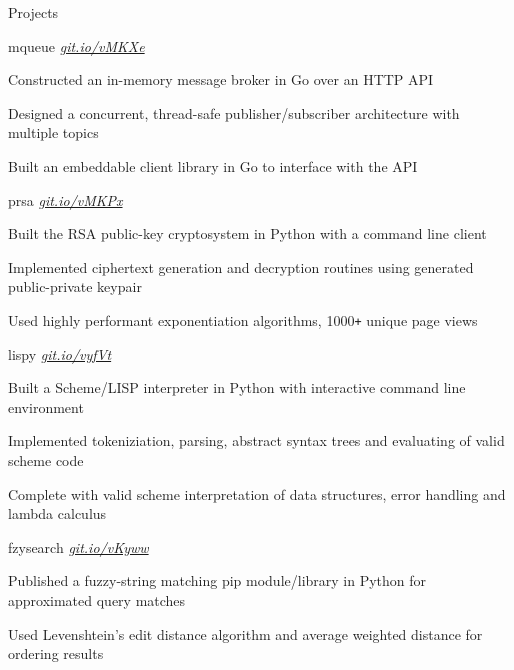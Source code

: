 \documentclass{resume} %
\begin{document}
\begin{rSection}{Projects}
  \begin{rSubsection}{mqueue}
	  {\em {\href{http://github.com/ridwanmsharif/mqueue}
		    {git.io/vMKXe}}}
	  {}

	  \item Constructed an in-memory message broker in Go
			  over an HTTP API
	  \item Designed a concurrent, thread-safe publisher/subscriber
		  architecture with multiple topics
      \item Built an embeddable client library in Go to interface with the API
        
  \end{rSubsection}

  \begin{rSubsection}{prsa}
	  {\em {\href{http://github.com/ridwanmsharif/prsa}
		    {git.io/vMKPx}}}
	  {}

	  \item Built the RSA public-key cryptosystem in Python with a
			  command line client
	  \item Implemented ciphertext generation and decryption routines using
		  generated public-private keypair
	  \item Used highly performant exponentiation algorithms,
		  1000\texttt{+} unique page views
  \end{rSubsection}

  \begin{rSubsection}{lispy}
	  {\em {\href{http://github.com/ridwanmsharif/lispy}
		    {git.io/vyfVt}}}
	  {}

	  \item Built a Scheme/LISP interpreter in Python with interactive command line environment
	  \item Implemented tokeniziation, parsing, abstract syntax trees and evaluating of valid scheme code
	  \item Complete with valid scheme interpretation of data structures, error handling and lambda calculus
  \end{rSubsection}

  \begin{rSubsection}{fzysearch}
	  {\em{ \href{http://github.com/ridwanmsharif/fzysearch}
		    {git.io/vKyww}}}
	  {}

	 \item Published a fuzzy-string matching pip module/library in
		 Python for approximated query matches
	\item Used Levenshtein's edit distance algorithm and average
		weighted distance for ordering results
  \end{rSubsection}
  

\end{rSection}
\end{document}
